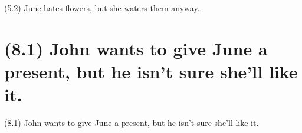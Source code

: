 \documentclass{article}
\begin{document}
\bigbreak
\begin{enumerate*}
\item[(5.2)] June hates flowers, but she waters them anyway.
\end{enumerate*}
\bigbreak

\bigbreak
\begin{minipage}{\textwidth}
\end{minipage}
\bigbreak

\clearpage

%
%

\section*{(8.1) John wants to give June a present, but he isn't sure she’ll like it.}

\bigbreak
\begin{enumerate*}
\item[(8.1)] John wants to give June a present, but he isn't sure she’ll like it.
\end{enumerate*}
\bigbreak
\end{document}
